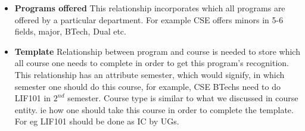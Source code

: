 \documentclass[a4paper]{article}
\begin{document}
\begin{itemize}
	\item{\textbf{Programs offered}} This relationship incorporates which all programs are offered by a
	particular department. For example CSE offers minors in 5-6 fields, major, BTech, Dual etc.
	\item{\textbf{Template}} Relationship between program and course is needed to store which all course one
	needs to complete in order to get this program's recognition. This relationship has an attribute semester,
	which would signify, in which semester one should do this course, for example, CSE BTechs need to do LIF101
	in $2^{nd}$ semester. Course type is similar to what we discussed in course entity. ie how one should take this
	course in order to complete the template. For eg LIF101 should be done as IC by UGs.
\end{itemize}

\pagebreak
\end{document}
